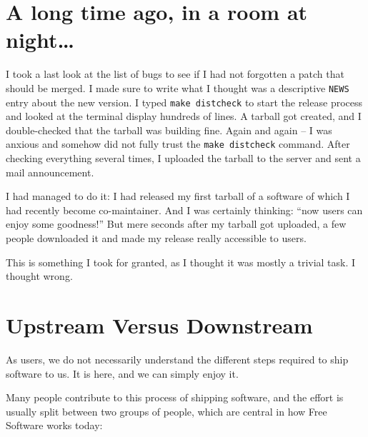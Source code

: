 

\section*{A long time ago, in a room at night\ldots}

\noindent{}I took a last look at the list of bugs to see if I had not forgotten a patch
that should be merged. I made sure to write what I thought was a descriptive
\texttt{NEWS} entry about the new version. I typed \texttt{make distcheck} to
start the release process and looked at the terminal display hundreds of lines.
A tarball got created, and I double-checked that the tarball was building fine.
Again and again -- I was anxious and somehow did not fully trust the
\texttt{make distcheck} command. After checking everything several times, I
uploaded the tarball to the server and sent a mail announcement.

I had managed to do it: I had released my first tarball of a software of which
I had recently become co-maintainer. And I was certainly thinking: ``now users
can enjoy some goodness!'' But mere seconds after my tarball got uploaded, a few
people downloaded it and made my release really accessible to users.

This is something I took for granted, as I thought it was mostly a trivial
task. I thought wrong.

\section*{Upstream Versus Downstream}

As users, we do not necessarily understand the different steps required to ship
software to us. It is here, and we can simply enjoy it.

Many people contribute to this process of shipping software, and the effort is
usually split between two groups of people, which are central in how Free
Software works today:

